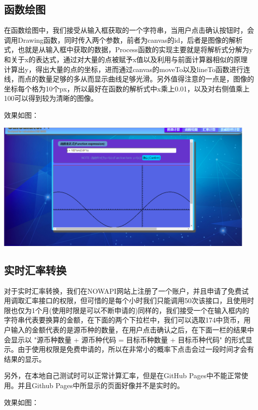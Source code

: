 \documentclass[hyperref,UTF8]{ctexart}
\begin{document}
\subsection{函数绘图}

在函数绘图中，我们接受从输入框获取的一个字符串，当用户点击确认按钮时，会调用Drawing函数，同时传入两个参数，前者为canvas的id，后者是图像的解析式，也就是从输入框中获取的数据，Process函数的实现主要就是将解析式分解为y和关于x的表达式，通过对大量的点被赋予x值以及利用与前面计算器相似的原理计算出y，得出大量的点的坐标，进而通过canvas的moveTo以及lineTo函数进行连线，而点的数量足够的多从而显示曲线足够光滑。另外值得注意的一点是，图像的坐标每个格为10个px，所以最好在函数的解析式中x乘上0.01，以及对右侧值乘上100可以得到较为清晰的图像。

效果如图：

\begin{center}
\includegraphics[width=5in]{func.PNG}
\end{center}

\subsection{实时汇率转换}

对于实时汇率转换，我们在NOWAPI网站上注册了一个账户，并且申请了免费试用调取汇率接口的权限，但可惜的是每个小时我们只能调用50次该接口，且使用时限也仅为1个月(使用时限是可以不断申请的)同样的，我们接受一个在输入框内的字符串代表要换算的金额，在下面的两个下拉栏中，我们可以选取174中货币，用户输入的金额代表的是源币种的数量，在用户点击确认之后，在下面一栏的结果中会显示以 "源币种数量 + 源币种代码 = 目标币种数量 + 目标币种代码" 的形式显示。由于使用权限是免费申请的，所以在非常小的概率下点击会过一段时间才会有结果的显示。 

另外，在本地自己测试时可以正常计算汇率，但是在GitHub Pages中不能正常使用。并且Github Pages中所显示的页面好像并不是实时的。

效果如图：
\end{document}
